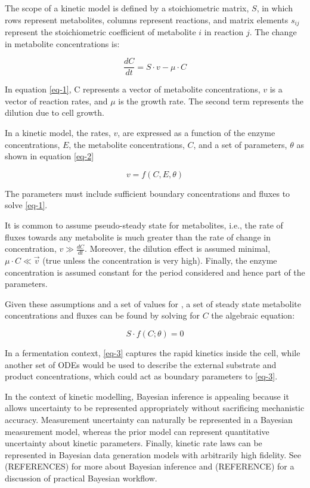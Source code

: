 \documentclass[journal=,manuscript=]{achemso}
\begin{document}
The scope of a kinetic model is defined by a stoichiometric matrix,
\(S\), in which rows represent metabolites, columns represent reactions,
and matrix elements \(s_{ij}\) represent the stoichiometric coefficient
of metabolite \(i\) in reaction \(j\). The change in metabolite
concentrations is:

\begin{equation}\label{eq-1}
\frac{dC}{dt} = S\cdot v - \mu\cdot C 
\end{equation}

In equation \eqref{eq-1}, C represents a vector of metabolite
concentrations, \(v\) is a vector of reaction rates, and \(\mu\) is the
growth rate. The second term represents the dilution due to cell growth.

In a kinetic model, the rates, \(v\), are expressed as a function of the
enzyme concentrations, \(E\), the metabolite concentrations, \(C\), and
a set of parameters, \(\theta\) as shown in equation \eqref{eq-2}

\begin{equation}\label{eq-2}
v = f(C, E, \theta)
\end{equation}

The parameters must include sufficient boundary concentrations and
fluxes to solve \eqref{eq-1}.

It is common to assume pseudo-steady state for metabolites, i.e., the
rate of fluxes towards any metabolite is much greater than the rate of
change in concentration, \(𝑣 \gg \frac{𝑑𝐶}{𝑑𝑡}\). Moreover, the dilution
effect is assumed minimal, \(\mu\cdot C \ll \vec{v}\) (true unless the
concentration is very high). Finally, the enzyme concentration is
assumed constant for the period considered and hence part of the
parameters.

Given these assumptions and a set of values for \theta, a set of steady
state metabolite concentrations and fluxes can be found by solving for
\(C\) the algebraic equation:

\begin{equation}\label{eq-3}
S\cdot f(C;\theta) = 0
\end{equation}

In a fermentation context, \eqref{eq-3} captures the rapid kinetics
inside the cell, while another set of ODEs would be used to describe the
external substrate and product concentrations, which could act as
boundary parameters to \eqref{eq-3}.

In the context of kinetic modelling, Bayesian inference is appealing
because it allows uncertainty to be represented appropriately without
sacrificing mechanistic accuracy. Measurement uncertainty can naturally
be represented in a Bayesian measurement model, whereas the prior model
can represent quantitative uncertainty about kinetic parameters.
Finally, kinetic rate laws can be represented in Bayesian data
generation models with arbitrarily high fidelity. See (REFERENCES) for
more about Bayesian inference and (REFERENCE) for a discussion of
practical Bayesian workflow.
\end{document}
